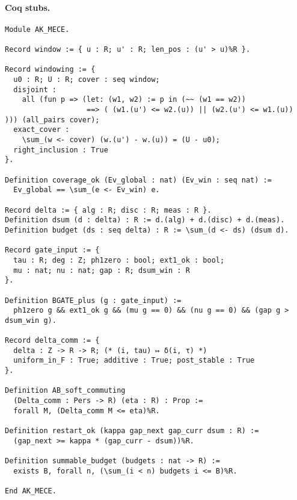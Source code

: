 \documentclass[11pt]{article}
\numberwithin{equation}{section}
\theoremstyle{definition}
\begin{document}
\paragraph{Coq stubs.}
\begin{verbatim}
Module AK_MECE.

Record window := { u : R; u' : R; len_pos : (u' > u)%R }.

Record windowing := {
  u0 : R; U : R; cover : seq window;
  disjoint :
    all (fun p => (let: (w1, w2) := p in (~~ (w1 == w2))
                   ==> ( (w1.(u') <= w2.(u)) || (w2.(u') <= w1.(u)) ))) (all_pairs cover);
  exact_cover :
    \sum_(w <- cover) (w.(u') - w.(u)) = (U - u0);
  right_inclusion : True
}.

Definition coverage_ok (Ev_global : nat) (Ev_win : seq nat) :=
  Ev_global == \sum_(e <- Ev_win) e.

Record delta := { alg : R; disc : R; meas : R }.
Definition dsum (d : delta) : R := d.(alg) + d.(disc) + d.(meas).
Definition budget (ds : seq delta) : R := \sum_(d <- ds) (dsum d).

Record gate_input := {
  tau : R; deg : Z; ph1zero : bool; ext1_ok : bool;
  mu : nat; nu : nat; gap : R; dsum_win : R
}.

Definition BGATE_plus (g : gate_input) :=
  ph1zero g && ext1_ok g && (mu g == 0) && (nu g == 0) && (gap g > dsum_win g).

Record delta_comm := {
  delta : Z -> R -> R; (* (i, tau) ↦ δ(i, τ) *)
  uniform_in_F : True; additive : True; post_stable : True
}.

Definition AB_soft_commuting
  (Delta_comm : Pers -> R) (eta : R) : Prop :=
  forall M, (Delta_comm M <= eta)%R.

Definition restart_ok (kappa gap_next gap_curr dsum : R) :=
  (gap_next >= kappa * (gap_curr - dsum))%R.

Definition summable_budget (budgets : nat -> R) :=
  exists B, forall n, (\sum_(i < n) budgets i <= B)%R.

End AK_MECE.
\end{verbatim}
\end{document}
